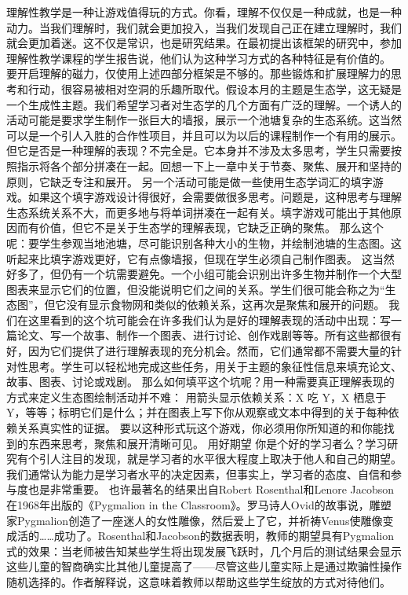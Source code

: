 理解性教学是一种让游戏值得玩的方式。你看，理解不仅仅是一种成就，也是一种动力。当我们理解时，我们就会更加投入，当我们发现自己正在建立理解时，我们就会更加着迷。这不仅是常识，也是研究结果。在最初提出该框架的研究中，参加理解性教学课程的学生报告说，他们认为这种学习方式的各种特征是有价值的。
要开启理解的磁力，仅使用上述四部分框架是不够的。那些锻炼和扩展理解力的思考和行动，很容易被相对空洞的乐趣所取代。假设本月的主题是生态学，这无疑是一个生成性主题。我们希望学习者对生态学的几个方面有广泛的理解。一个诱人的活动可能是要求学生制作一张巨大的墙报，展示一个池塘复杂的生态系统。这当然可以是一个引人入胜的合作性项目，并且可以为以后的课程制作一个有用的展示。但它是否是一种理解的表现？不完全是。它本身并不涉及太多思考，学生只需要按照指示将各个部分拼凑在一起。回想一下上一章中关于节奏、聚焦、展开和坚持的原则，它缺乏专注和展开。
另一个活动可能是做一些使用生态学词汇的填字游戏。如果这个填字游戏设计得很好，会需要做很多思考。问题是，这种思考与理解生态系统关系不大，而更多地与将单词拼凑在一起有关。填字游戏可能出于其他原因而有价值，但它不是关于生态学的理解表现，它缺乏正确的聚焦。
那么这个呢：要学生参观当地池塘，尽可能识别各种大小的生物，并绘制池塘的生态图。这听起来比填字游戏更好，它有点像墙报，但现在学生必须自己制作图表。
这当然好多了，但仍有一个坑需要避免。一个小组可能会识别出许多生物并制作一个大型图表来显示它们的位置，但没能说明它们之间的关系。学生们很可能会称之为“生态图”，但它没有显示食物网和类似的依赖关系，这再次是聚焦和展开的问题。
我们在这里看到的这个坑可能会在许多我们认为是好的理解表现的活动中出现：写一篇论文、写一个故事、制作一个图表、进行讨论、创作戏剧等等。所有这些都很有好，因为它们提供了进行理解表现的充分机会。然而，它们通常都不需要大量的针对性思考。学生可以轻松地完成这些任务，用关于主题的象征性信息来填充论文、故事、图表、讨论或戏剧。
那么如何填平这个坑呢？用一种需要真正理解表现的方式来定义生态图绘制活动并不难：
用箭头显示依赖关系：X 吃 Y，X 栖息于 Y，等等；标明它们是什么；并在图表上写下你从观察或文本中得到的关于每种依赖关系真实性的证据。
要以这种形式玩这个游戏，你必须用你所知道的和你能找到的东西来思考，聚焦和展开清晰可见。
用好期望
你是个好的学习者么？学习研究有个引人注目的发现，就是学习者的水平很大程度上取决于他人和自己的期望。我们通常认为能力是学习者水平的决定因素，但事实上，学习者的态度、自信和参与度也是非常重要。
也许最著名的结果出自Robert Rosenthal和Lenore Jacobson在1968年出版的《Pygmalion in the Classroom》。罗马诗人Ovid的故事说，雕塑家Pygmalion创造了一座迷人的女性雕像，然后爱上了它，并祈祷Venus使雕像变成活的……成功了。Rosenthal和Jacobson的数据表明，教师的期望具有Pygmalion式的效果：当老师被告知某些学生将出现发展飞跃时，几个月后的测试结果会显示这些儿童的智商确实比其他儿童提高了——尽管这些儿童实际上是通过欺骗性操作随机选择的。作者解释说，这意味着教师以帮助这些学生绽放的方式对待他们。
